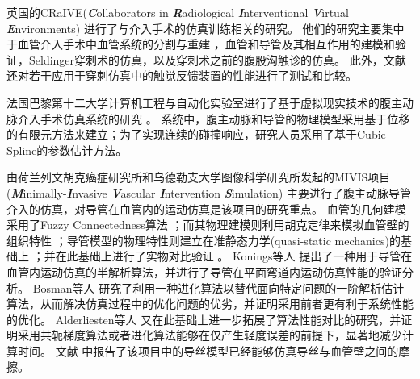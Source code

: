 英国的CRaIVE(\textbf{\textit{C}}ollaborators in \textbf{\textit{R}}adiological \textbf{\textit{I}}nterventional \textbf{\textit{V}}irtual \textbf{\textit{E}}nvironments) \cite{CRaIVEweb}进行了与介入手术的仿真训练相关的研究。%
他们的研究主要集中于血管介入手术中血管系统的分割与重建 \cite{Luboz2008aCRaIVE}，血管和导管及其相互作用的建模和验证\cite{Luboz2010CRaIVE,Luboz2009aCRaIVE,Luboz2008CRaIVE}，Seldinger穿刺术的仿真\cite{luboz2009CRaIVE,John2008CRaIVE}，以及穿刺术之前的腹股沟触诊的仿真\cite{Coles2011CRaIVE,Coles2009CRaIVE}。%
此外，文献 \cite{Coles2010CRaIVE}还对若干应用于穿刺仿真中的触觉反馈装置的性能进行了测试和比较。

法国巴黎第十二大学计算机工程与自动化实验室进行了基于虚拟现实技术的腹主动脉介入手术仿真系统的研究 \cite{Ghembaza2004Paris12U}。
系统中，腹主动脉和导管的物理模型采用基于位移的有限元方法来建立；为了实现连续的碰撞响应，研究人员采用了基于Cubic Spline的参数估计方法。

由荷兰列文胡克癌症研究所和乌德勒支大学图像科学研究所发起的MIVIS项目(\textbf{\textit{M}}inimally-\textbf{\textit{I}}nvasive \textbf{\textit{V}}ascular \textbf{\textit{I}}ntervention \textbf{\textit{S}}imulation) \cite{alderliesten2002NKI,Konings2003NKI,alderliesten2004NKI,Bosman2005NKI,alderliesten2007NKI,alderliesten2007aNKI}主要进行了腹主动脉导管介入的仿真，对导管在血管内的运动仿真是该项目的研究重点。%
血管的几何建模采用了Fuzzy Connectedness算法 \cite{Udupa1996NKI,alderliesten2002NKI,alderliesten2004NKI}；而其物理建模则利用胡克定律来模拟血管壁的组织特性 \cite{alderliesten2002NKI,alderliesten2004NKI}；导管模型的物理特性则建立在准静态力学(quasi-static mechanics)的基础上 \cite{alderliesten2002NKI,alderliesten2004NKI}；并在此基础上进行了实物对比验证 \cite{alderliesten2002NKI,alderliesten2004NKI}。%
Konings等人 \cite{Konings2003NKI}提出了一种用于导管在血管内运动仿真的半解析算法，并进行了导管在平面弯道内运动仿真性能的验证分析。
Bosman等人 \cite{Bosman2005NKI}研究了利用一种进化算法以替代面向特定问题的一阶解析估计算法，从而解决仿真过程中的优化问题的优劣，并证明采用前者更有利于系统性能的优化。
Alderliesten等人 \cite{alderliesten2007NKI}又在此基础上进一步拓展了算法性能对比的研究，并证明采用共轭梯度算法或者进化算法能够在仅产生轻度误差的前提下，显著地减少计算时间。
文献 \cite{alderliesten2007aNKI}中报告了该项目中的导丝模型已经能够仿真导丝与血管壁之间的摩擦。

